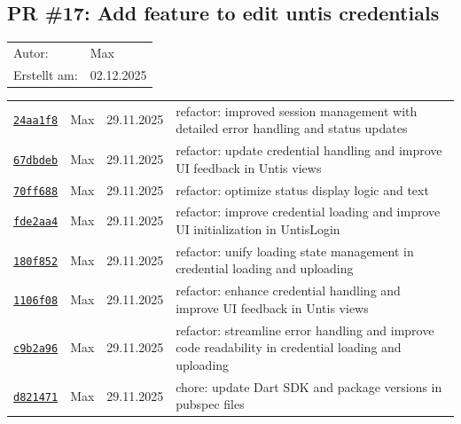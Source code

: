 \documentclass{article}%
\begin{document}
\subsection{PR \#17: Add feature to edit untis credentials}%
\label{pr:17}%
\begin{tabular}{l l}%
Autor:&Max\\%
Erstellt am: &02.12.2025\\%
\end{tabular}%
\begin{longtable}{l l l p{12cm}}%
\href{https://github.com/scriptor1000/homeworks/pull/17/commits/24aa1f864a6c367a1059f3dea15dada03bdb94e4}{\underline{\texttt{24aa1f8}}}&Max&29.11.2025&refactor: improved session management with detailed error handling and status updates\\%
\href{https://github.com/scriptor1000/homeworks/pull/17/commits/67dbdebbe6528b530ea203551fb947f33faccbfe}{\underline{\texttt{67dbdeb}}}&Max&29.11.2025&refactor: update credential handling and improve UI feedback in Untis views\\%
\href{https://github.com/scriptor1000/homeworks/pull/17/commits/70ff6885a30457a293a9e40db1e9ead073882509}{\underline{\texttt{70ff688}}}&Max&29.11.2025&refactor: optimize status display logic and text\\%
\href{https://github.com/scriptor1000/homeworks/pull/17/commits/fde2aa4a41ec260bf54f6cb54547a5e39e99862b}{\underline{\texttt{fde2aa4}}}&Max&29.11.2025&refactor: improve credential loading and improve UI initialization in UntisLogin\\%
\href{https://github.com/scriptor1000/homeworks/pull/17/commits/180f852fe16cb873e51f7b717266e99bdbc4e876}{\underline{\texttt{180f852}}}&Max&29.11.2025&refactor: unify loading state management in credential loading and uploading\\%
\href{https://github.com/scriptor1000/homeworks/pull/17/commits/1106f08d6caff8652f9cc7f8cee9878431220615}{\underline{\texttt{1106f08}}}&Max&29.11.2025&refactor: enhance credential handling and improve UI feedback in Untis views\\%
\href{https://github.com/scriptor1000/homeworks/pull/17/commits/c9b2a96a18ed3d04f96a97d45363394df977a745}{\underline{\texttt{c9b2a96}}}&Max&29.11.2025&refactor: streamline error handling and improve code readability in credential loading and uploading\\%
\href{https://github.com/scriptor1000/homeworks/pull/17/commits/d8214712db7672b185d0c434acedef2696fc4796}{\underline{\texttt{d821471}}}&Max&29.11.2025&chore: update Dart SDK and package versions in pubspec files\\%

\end{longtable}
\end{document}
